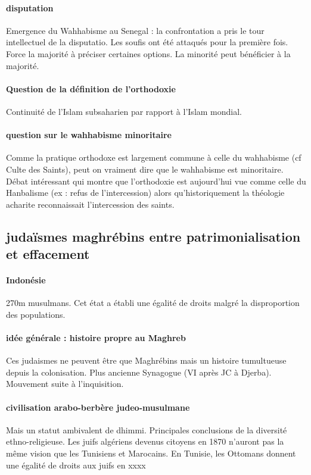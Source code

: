 \paragraph{disputation} Emergence du Wahhabisme au Senegal : la confrontation a pris le tour intellectuel de la disputatio. Les soufis ont été attaqués pour la première fois. Force la majorité à préciser certaines options. La minorité peut bénéficier à la majorité. 

\paragraph{Question de la définition de l’orthodoxie} Continuité de l’Islam subsaharien par rapport à l’Islam mondial.

\paragraph{question sur le wahhabisme minoritaire} Comme la pratique orthodoxe est largement commune à celle du wahhabisme (cf Culte des Saints), peut on vraiment dire que le wahhabisme est minoritaire. 
Débat intéressant qui montre que l’orthodoxie est aujourd’hui vue comme celle du Hanbalisme (ex : refus de l’intercession) alors qu’historiquement la théologie acharite reconnaissait l’intercession des saints. 


\subsection{judaïsmes maghrébins entre patrimonialisation et effacement}

\paragraph{Indonésie} 270m musulmans.  Cet état a établi une égalité de droits malgré la disproportion des populations. 

\paragraph{idée générale : histoire propre au Maghreb} Ces judaismes ne peuvent être que Maghrébins mais un histoire tumultueuse depuis la colonisation.  Plus ancienne Synagogue (VI après JC à Djerba). Mouvement suite à l’inquisition. 
\paragraph{civilisation arabo-berbère judeo-musulmane} Mais un statut ambivalent de dhimmi. Principales conclusions de la diversité ethno-religieuse.  Les juifs algériens devenus citoyens en 1870 n’auront pas la même vision que les Tunisiens et Marocains. En Tunisie, les Ottomans donnent une égalité de droits aux juifs en xxxx


